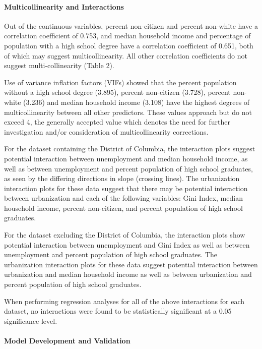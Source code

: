 \documentclass[
]{article}
\begin{document}
\hypertarget{multicollinearity-and-interactions-1}{%
\paragraph{Multicollinearity and
Interactions}\label{multicollinearity-and-interactions-1}}

Out of the continuous variables, percent non-citizen and percent
non-white have a correlation coefficient of 0.753, and median household
income and percentage of population with a high school degree have a
correlation coefficient of 0.651, both of which may suggest
multicollinearity. All other correlation coefficients do not suggest
multi-collinearity (Table 2).

Use of variance inflation factors (VIFs) showed that the percent
population without a high school degree (3.895), percent non-citizen
(3.728), percent non-white (3.236) and median household income (3.108)
have the highest degrees of multicollinearity between all other
predictors. These values approach but do not exceed 4, the generally
accepted value which denotes the need for further investigation and/or
consideration of multicollinearity corrections.

For the dataset containing the District of Columbia, the interaction
plots suggest potential interaction between unemployment and median
household income, as well as between unemployment and percent population
of high school graduates, as seen by the differing directions in slope
(crossing lines). The urbanization interaction plots for these data
suggest that there may be potential interaction between urbanization and
each of the following variables: Gini Index, median household income,
percent non-citizen, and percent population of high school graduates.

For the dataset excluding the District of Columbia, the interaction
plots show potential interaction between unemployment and Gini Index as
well as between unemployment and percent population of high school
graduates. The urbanization interaction plots for these data suggest
potential interaction between urbanization and median household income
as well as between urbanization and percent population of high school
graduates.

When performing regression analyses for all of the above interactions
for each dataset, no interactions were found to be statistically
significant at a 0.05 significance level.

\hypertarget{model-development-and-validation-1}{%
\paragraph{Model Development and
Validation}\label{model-development-and-validation-1}}
\end{document}
